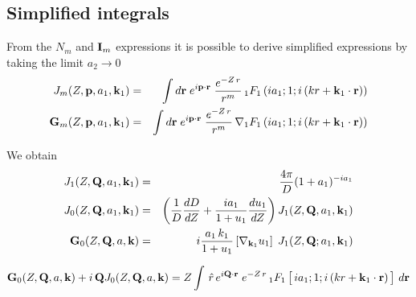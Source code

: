 \subsection{Simplified integrals}
From the $N_{m}$ and $\mathbf{I}_{m}$ expressions it is possible to derive
simplified expressions by taking the limit $a_{2} \to 0$
%
\begin{eqnarray}\label{Q:Jm}%
 J_{m}( Z, \vect{p}, a_{1}, \vect{k}_{1} ) &=&
\int d \vect{r} \; e^{i \vect{p} \cdot \vect{r}} \; \frac{e^{- Z
\, r}}{r^{m}} \, {_{1}F_{1}} \left( i a_{1} ; 1 ;i \left(k r +
\vect{k}_{1}\cdot \vect{r} \right)\right) \\
\vect{G}_{m}( Z, \vect{p}, a_{1}, \vect{k}_{1} ) &=& \int d \vect{r} \;
e^{i \vect{p} \cdot \vect{r}} \; \frac{e^{- Z \, r}}{r^{m}} \,
\nabla {_{1}F_{1}} \left( i a_{1} ; 1 ;i \left(k r +
\vect{k}_{1}\cdot \vect{r} \right)\right)
\end{eqnarray}

  \noindent
We obtain
\begin{eqnarray}\label{Q:Jint}
J_{1}( Z, \mathbf{Q}, a_{1}, \mathbf{k}_{1} ) &=& \frac{4 \pi}{D} (1+a_{1})^{-
i a_{1}}
\\
J_{0}( Z, \mathbf{Q}, a_{1}, \mathbf{k}_{1} ) &=& \left( \frac{1}{D} \frac{d
D}{d Z} + \frac{i a_{1}}{1 + u_{1}} \frac{d u_{1}}{d Z}
\right) J_{1}( Z, \mathbf{Q}, a_{1}, \mathbf{k}_{1} ) \\
\mathbf{G}_{0}( Z, \mathbf{Q}, a, \mathbf{k} ) &=&  i  \frac{ a_{1}\, k_{1}}{1 +
u_{1}} \left[ \nabla_{\mathbf{k}_{1}} u_{1} \right] \; J_{1}(Z,\mathbf{Q};
a_{1},\mathbf{k}_{1})
\end{eqnarray}

\begin{equation}\label{Q:G_if}
\vect{G}_{0}( Z, \vect{Q}, a, \vect{k} ) + i\, \vect{Q} J_{0}( Z, \vect{Q}, a,
\vect{k} ) = Z \int \,\hat{r} \,e^{i \vect{Q} \cdot \vect{r}} \;
e^{- Z \, r} \, {_{1}F_{1}} \left[\, i a_{1} ; 1 ;i \left(k r
+ \vect{k}_{1}\cdot \vect{r} \right) \vstretch \right]\, d \vect{r}
\end{equation}
%

